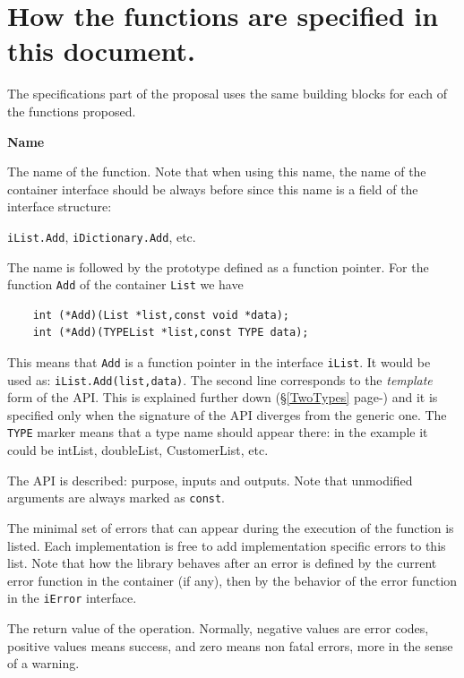 \section{How the functions are specified in this document.}
The specifications part of the proposal uses the same building blocks for each of the functions proposed.\par\noindent
\textbf{Name}

\noindent The name of the function. Note that when using this name, the name of the container interface should be always before 
since this name is a field of the interface structure:

\noindent \verb,iList.Add,, \verb,iDictionary.Add,, etc.

\noindent The name is followed by the prototype defined as a function pointer. For the function \verb,Add, of the container \verb,List, we have
\begin{verbatim}
    int (*Add)(List *list,const void *data);
    int (*Add)(TYPEList *list,const TYPE data);
\end{verbatim} 
This means that \verb,Add, is a function pointer in the interface \verb,iList,. It would be used as:
\texttt{iList.Add(list,data)}.
The second line corresponds to the \textsl{template} form of the API. This is explained further down (\S \ref{TwoTypes} page-\pageref{TwoTypes}) and
it is specified only when the signature of the API diverges from the generic one. The \verb,TYPE, marker means that
a type name should appear there: in the example it could be intList, doubleList, CustomerList, etc.

\apidescription The API is described: purpose, inputs and outputs. Note that unmodified arguments are always marked
as \verb,const,.

\apierrors
The minimal set of errors that can appear during the execution of the function is listed. Each implementation 
is free to add implementation specific errors to this list. Note that how the library behaves after an error is 
defined by the current error function in the container (if any), then by the behavior of the error function in the 
\verb,iError, interface.

\returns
The return value of the operation. Normally, negative values are error codes, positive values means success, and zero means non fatal errors, more in the sense of a warning.

